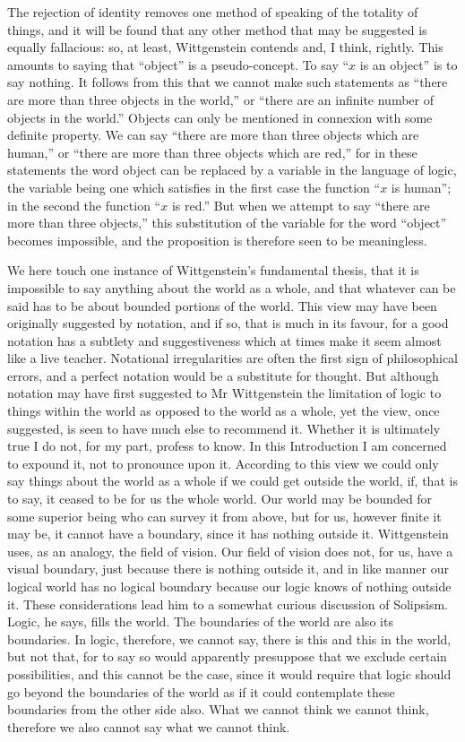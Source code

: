 \documentclass[12pt,oneside]{book}[2007/10/19]
\begin{document}
The rejection of identity removes one method of
speaking of the totality of things, and it will be found
that any other method that may be suggested is equally
fallacious: so, at least, Wittgenstein contends and, I
think, rightly. This amounts to saying that ``object'' is
a pseudo-concept. To say ``$x$ is an object'' is to say
nothing. It follows from this that we cannot make such
statements as ``there are more than three objects in the
world,'' or ``there are an infinite number of objects in
the world.'' Objects can only be mentioned in connexion
with some definite property. We can say ``there are more
than three objects which are human,'' or ``there are more
than three objects which are red,'' for in these statements
the word object can be replaced by a variable in the
language of logic, the variable being one which satisfies
in the first case the function ``$x$ is human''; in the second
the function ``$x$ is red.'' But when we attempt to say
``there are more than three objects,'' this substitution of
the variable for the word ``object'' becomes impossible,
and the proposition is therefore seen to be meaningless.

We here touch one instance of Wittgenstein's fundamental
thesis, that it is impossible to say anything about
the world as a whole, and that whatever can be said has
to be about bounded portions of the world. This view
may have been originally suggested by notation, and if
so, that is much in its favour, for a good notation has
a subtlety and suggestiveness which at times make it
seem almost like a live teacher. Notational irregularities
are often the first sign of philosophical errors, and
a perfect notation would be a substitute for thought.
But although notation may have first suggested to
Mr Wittgenstein the limitation of logic to things within
the world as opposed to the world as a whole, yet the
view, once suggested, is seen to have much else to
recommend it. Whether it is ultimately true I do not,
for my part, profess to know. In this Introduction I
am concerned to expound it, not to pronounce upon it.
According to this view we could only say things about
the world as a whole if we could get outside the world,
if, that is to say, it ceased to be for us the whole world.
Our world may be bounded for some superior being who
can survey it from above, but for us, however finite it
may be, it cannot have a boundary, since it has nothing
outside it. Wittgenstein uses, as an analogy, the field
of vision. Our field of vision does not, for us, have a
visual boundary, just because there is nothing outside
it, and in like manner our logical world has no logical
boundary because our logic knows of nothing outside it.
These considerations lead him to a somewhat curious
discussion of Solipsism. Logic, he says, fills the world.
The boundaries of the world are also its boundaries. In
logic, therefore, we cannot say, there is this and this in
the world, but not that, for to say so would apparently
presuppose that we exclude certain possibilities, and this
cannot be the case, since it would require that logic
should go beyond the boundaries of the world as if it
could contemplate these boundaries from the other side
also. What we cannot think we cannot think, therefore
we also cannot say what we cannot think.
\end{document}
